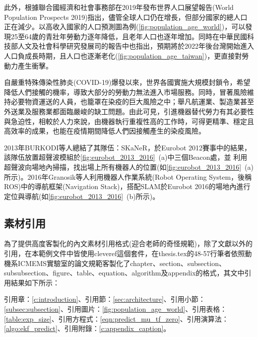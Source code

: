 此外，根據聯合國經濟和社會事務部在2019年發布世界人口展望報告(World Population Prospects 2019)\cite{nations2019world}指出，儘管全球人口仍在增長，但部分國家的總人口正在減少。以高收入國家的人口預測圖為例(\cref{fig:population_age_world})，可以發現25至64歲的青壯年勞動力逐年降低，且老年人口也逐年增加。同時在中華民國科技部人文及社會科學研究發展司的報告中也指出\cite{人文與社科簡訊_人口老化}，預期將於2022年後台灣開始進入人口負成長時期，且人口也逐漸老化(\cref{fig:population_age_taiwan})，更直接對勞動力產生衝擊。

自嚴重特殊傳染性肺炎(COVID-19)爆發以來，世界各國實施大規模封鎖令，希望降低人們接觸的機率，導致大部分的勞動力無法進入市場服務。同時，冒著風險維持必要物資運送的人員，也籠罩在染疫的巨大風險之中；舉凡航運業、製造業甚至外送業及服務業都面臨嚴峻的缺工問題。由此可見，引進機器替代勞力有其必要性與急迫性，相較於人力來說，由機器執行重複性高的工作時，可得更精準、穩定且高效率的成果，也能在疫情期間降低人們因接觸產生的染疫風險。

2013年BURKODI等人\cite{eurobot_ultrasound_2013}總結了其隊伍：SKaNeR，於Eurobot 2012賽事中的結果，該隊伍放置超聲波模組於\cref{fig:eurobot_2013_2016}~(a)中三個Beacon處，並
利用超聲波向場地內掃描，找出場上所有機器人的位置(如\cref{fig:eurobot_2013_2016}~(a)所示)。2016年Granosik等人\cite{eurobot_ros_2016}利用機器人作業系統(Robot Operating System，後稱ROS)\cite{ros_2009}中的導航框架(Navigation Stack)，搭配SLAM於Eurobot 2016的場地內進行定位與導航(如\cref{fig:eurobot_2013_2016}~(b)所示)。


\subsection{素材引用}

為了提供高度客製化的內文素材引用格式(迎合老師的奇怪規範)，除了文獻以外的引用，在本範例文件中皆使用cleveref這個套件，在thesis.tex的48-57行筆者依照動機系ICMEMS實驗室的論文規範客製化了chapter、section、subsection、subsubsection、figure、table、equation、algorithm及appendix的格式，其文中引用結果如下所示：

引用章：\cref{c:introduction}、引用節：\cref{sec:architecture}、引用小節：\cref{subsec:subsection}、引用圖片：\cref{fig:population_age_world}、引用表格：\cref{table:exp_size}、引用方程式：\cref{eqn:predict_mu_tf_zero}、引用演算法：\cref{algo:ekf_predict}、引用附錄：\cref{c:appendix_caption}。